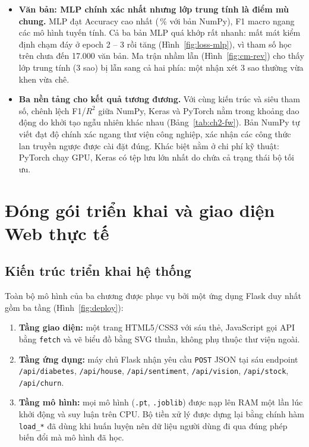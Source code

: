 \begin{itemize}
  \item \textbf{Văn bản: MLP chính xác nhất nhưng lớp trung tính là điểm mù chung.} MLP đạt Accuracy cao nhất
    (\,\% với bản NumPy), F1 macro ngang các mô hình tuyến tính. Cả ba bản MLP quá khớp
    rất nhanh: mất mát kiểm định chạm đáy ở epoch 2 -- 3 rồi tăng (Hình~\ref{fig:loss-mlp}), vì
     tham số học trên chưa đến 17.000 văn bản. Ma trận nhầm lẫn (Hình~\ref{fig:cm-rev}) cho
    thấy lớp trung tính (3 sao) bị lẫn sang cả hai phía: một nhận xét 3 sao thường vừa khen vừa chê.
  \item \textbf{Ba nền tảng cho kết quả tương đương.} Với cùng kiến trúc và siêu tham số, chênh lệch F1/$R^2$ giữa NumPy,
    Keras và PyTorch nằm trong khoảng dao động do khởi tạo ngẫu nhiên khác nhau (Bảng~\ref{tab:ch2-fw}). Bản NumPy tự viết
    đạt độ chính xác ngang thư viện công nghiệp, xác nhận các công thức lan truyền ngược được cài đặt đúng. Khác biệt nằm ở
    chi phí kỹ thuật: PyTorch chạy GPU, Keras có tệp lưu lớn nhất do chứa cả trạng thái bộ tối ưu.
\end{itemize}

\section{Đóng gói triển khai và giao diện Web thực tế}
\label{sec:web}

\subsection{Kiến trúc triển khai hệ thống}

Toàn bộ mô hình của ba chương được phục vụ bởi một ứng dụng Flask duy nhất gồm ba tầng (Hình~\ref{fig:deploy}):
\begin{enumerate}
  \item \textbf{Tầng giao diện:} một trang HTML5/CSS3 với sáu thẻ, JavaScript gọi API bằng \texttt{fetch} và vẽ biểu đồ
    bằng SVG thuần, không phụ thuộc thư viện ngoài.
  \item \textbf{Tầng ứng dụng:} máy chủ Flask nhận yêu cầu \texttt{POST} JSON tại sáu endpoint
    \texttt{/api/diabetes}, \texttt{/api/house}, \texttt{/api/sentiment}, \texttt{/api/vision}, \texttt{/api/stock},
    \texttt{/api/churn}.
  \item \textbf{Tầng mô hình:} mọi mô hình (\texttt{.pt}, \texttt{.joblib}) được nạp lên RAM một lần lúc khởi động và suy
    luận trên CPU. Bộ tiền xử lý được dựng lại bằng chính hàm \texttt{load\_*} đã dùng khi huấn luyện nên dữ liệu người
    dùng đi qua đúng phép biến đổi mà mô hình đã học.
\end{enumerate}

